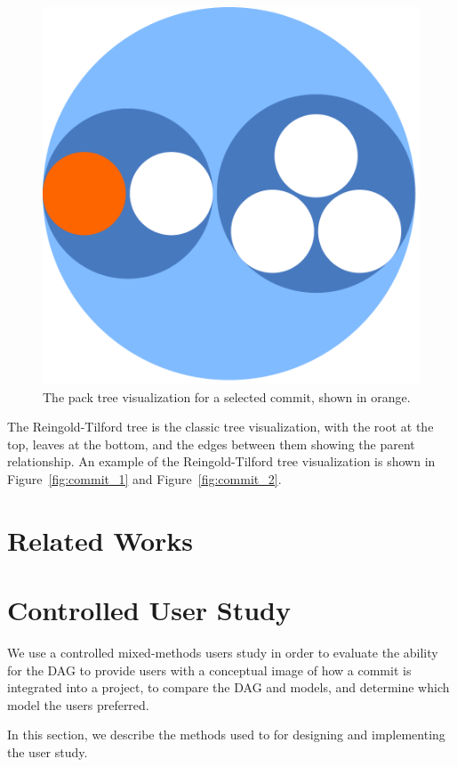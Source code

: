 \documentclass[draft]{IEEEtran}
\begin{document}
\begin{figure}[htpb]
  \centering
  \includegraphics[width=0.8\linewidth]{figures/linvis/linvis_bubble.pdf}
  \caption{The pack tree visualization for a selected commit, shown in
    orange.}
  \label{fig:linvis_pack}
\end{figure}

The Reingold-Tilford tree is the classic tree visualization, with the
root at the top, leaves at the bottom, and the edges between them
showing the parent relationship. An example of the Reingold-Tilford tree
visualization is shown in Figure~\ref{fig:commit_1} and
Figure~\ref{fig:commit_2}.


\section{Related Works}
\label{sec:related_works}



\section{Controlled User Study}
\label{sec:study}

We use a controlled mixed-methods users study in order to evaluate the
ability for the DAG to provide users with a conceptual image of how a
commit is integrated into a project, to compare the DAG and \mt models,
and determine which model the users preferred.

In this section, we describe the methods used to for designing and
implementing the user study.
\end{document}

